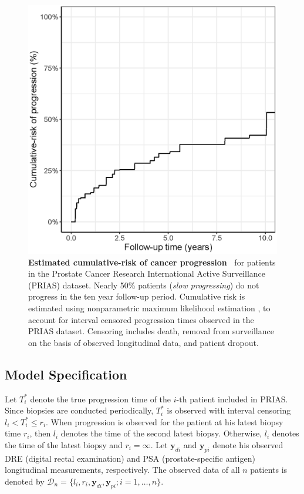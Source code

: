 \begin{figure}
\centerline{\includegraphics[width=\columnwidth]{images/npmle_plot.eps}}
\caption{\textbf{Estimated cumulative-risk of cancer progression~\citep{tomer2020webapp}} for patients in the Prostate Cancer Research International Active Surveillance (PRIAS) dataset. Nearly 50\% patients (\textit{slow progressing}) do not progress in the ten year follow-up period. Cumulative risk is estimated using nonparametric maximum likelihood estimation \citep{turnbull1976empirical}, to account for interval censored progression times observed in the PRIAS dataset. Censoring includes death, removal from surveillance on the basis of observed longitudinal data, and patient dropout.}
\label{fig:npmle_plot}
\end{figure}

\subsection{Model Specification}
Let $T_i^*$ denote the true progression time of the ${i\mbox{-th}}$ patient included in PRIAS. Since biopsies are conducted periodically, $T_i^*$ is observed with interval censoring ${l_i < T_i^* \leq r_i}$. When progression is observed for the patient at his latest biopsy time $r_i$, then $l_i$ denotes the time of the second latest biopsy. Otherwise, $l_i$ denotes the time of the latest biopsy and ${r_i=\infty}$. Let $\boldsymbol{y}_{di}$ and $\boldsymbol{y}_{pi}$ denote his observed DRE (digital rectal examination) and PSA (prostate-specific antigen) longitudinal measurements, respectively. The observed data of all $n$ patients is denoted by ${\mathcal{D}_n = \{l_i, r_i, \boldsymbol{y}_{di}, \boldsymbol{y}_{pi}; i = 1, \ldots, n\}}$.

